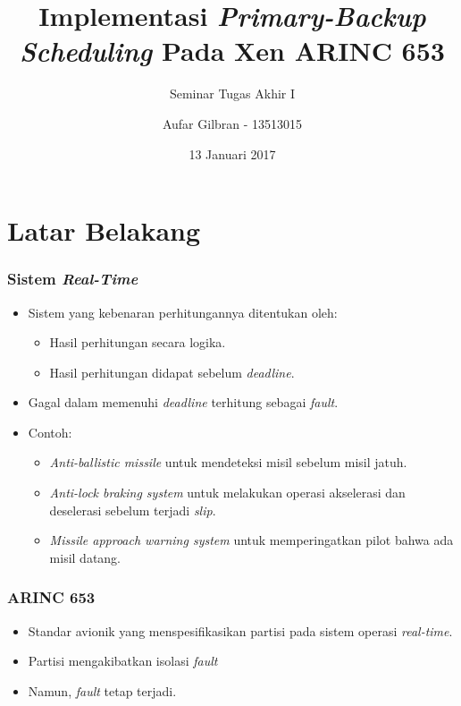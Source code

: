 \documentclass[xetex]{beamer}
\title{Implementasi \textit{Primary-Backup Scheduling} Pada Xen ARINC 653}
\subtitle{Seminar Tugas Akhir I}
\author{Aufar Gilbran - 13513015}
\date{13 Januari 2017}
\begin{document}
    \frame{\titlepage}
    \section{Latar Belakang}
    \begin{frame}
        \frametitle{Sistem \textit{Real-Time}}
        \begin{itemize}
            \item Sistem yang kebenaran perhitungannya ditentukan oleh:
                \begin{itemize}
                    \item Hasil perhitungan secara logika.
                    \item Hasil perhitungan didapat sebelum \textit{deadline}.
                \end{itemize}
            \item Gagal dalam memenuhi \textit{deadline} terhitung sebagai \textit{fault}.
            \item Contoh:
                \begin{itemize}
                    \item \textit{Anti-ballistic missile} untuk mendeteksi misil sebelum misil jatuh.
                    \item \textit{Anti-lock braking system} untuk melakukan operasi akselerasi dan deselerasi sebelum terjadi \textit{slip}.
                    \item \textit{Missile approach warning system} untuk memperingatkan pilot bahwa ada misil datang.
                \end{itemize}
        \end{itemize}
    \end{frame}
    \begin{frame}
        \frametitle{ARINC 653}
        \begin{itemize}
            \item Standar avionik yang menspesifikasikan partisi pada sistem operasi \textit{real-time}.
            \item Partisi mengakibatkan isolasi \textit{fault}
            \item Namun, \textit{fault} tetap terjadi.
        \end{itemize}
    \end{frame}
\end{document}
